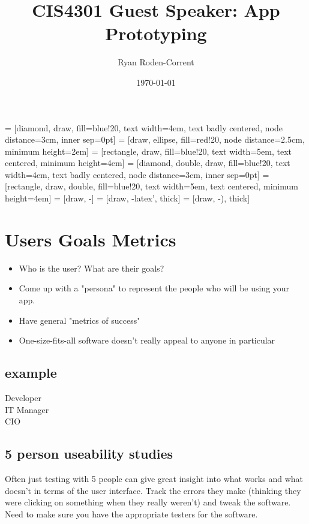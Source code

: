 \documentclass[12pt]{article}
\title{CIS4301 Guest Speaker: App Prototyping}
\author{Ryan Roden-Corrent}
\date{\today}
\begin{document}
\setlength\parindent{0pt}
 = [diamond, draw, fill=blue!20, text width=4em,
  text badly centered, node distance=3cm, inner sep=0pt]
 = [draw, ellipse, fill=red!20, node distance=2.5cm,
  minimum height=2em]
 = [rectangle, draw, fill=blue!20, text width=5em,
  text centered, minimum height=4em]
 = [diamond, double, draw, fill=blue!20, text width=4em,
  text badly centered, node distance=3cm, inner sep=0pt]
 = [rectangle, draw, double, fill=blue!20, text width=5em,
  text centered, minimum height=4em]
 = [draw, -]
 = [draw, -latex', thick]
 = [draw, -), thick]
\maketitle

\section{Users Goals Metrics}
\begin{itemize}
  \item Who is the user? What are their goals?
  \item Come up with a "persona" to represent the people who will
    be using your app.
  \item Have general "metrics of success"
  \item One-size-fits-all software doesn't really appeal to anyone in particular
\end{itemize}

\subsection{example}
\begin{description}
  \item[Developer]
  \item[IT Manager]
  \item[CIO]
\end{description}

\subsection{5 person useability studies}
Often just testing with 5 people can give great insight into what works and
what doesn't in terms of the user interface. Track the errors they make
(thinking they were clicking on something when they really weren't) and tweak
the software. Need to make sure you have the appropriate testers for the
software.
\end{document}
